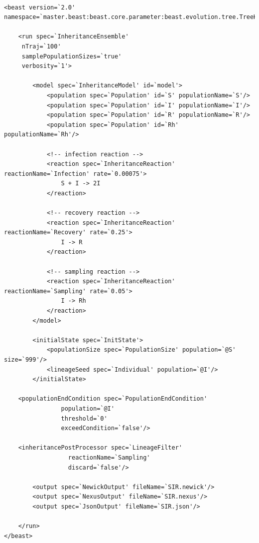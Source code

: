 \documentclass[10pt]{article}
\begin{document}
\footnotesize{
\begin{lstlisting}

<beast version=`2.0' 
namespace=`master.beast:beast.core.parameter:beast.evolution.tree.TreeHeightLogger'>

    <run spec=`InheritanceEnsemble'
	 nTraj=`100'
	 samplePopulationSizes=`true'
	 verbosity=`1'>

        <model spec=`InheritanceModel' id=`model'>
            <population spec=`Population' id=`S' populationName=`S'/>
            <population spec=`Population' id=`I' populationName=`I'/>
            <population spec=`Population' id=`R' populationName=`R'/>
            <population spec=`Population' id=`Rh' populationName=`Rh'/>
            
            <!-- infection reaction -->
            <reaction spec=`InheritanceReaction' reactionName=`Infection' rate=`0.00075'>
                S + I -> 2I
            </reaction>
            
            <!-- recovery reaction -->
            <reaction spec=`InheritanceReaction' reactionName=`Recovery' rate=`0.25'>
                I -> R
            </reaction>
            
            <!-- sampling reaction -->
            <reaction spec=`InheritanceReaction' reactionName=`Sampling' rate=`0.05'>
                I -> Rh
            </reaction>
        </model>

        <initialState spec=`InitState'>
            <populationSize spec=`PopulationSize' population=`@S' size=`999'/>
            <lineageSeed spec=`Individual' population=`@I'/>
        </initialState>

	<populationEndCondition spec=`PopulationEndCondition'
				population=`@I'
				threshold=`0'
				exceedCondition=`false'/>

	<inheritancePostProcessor spec=`LineageFilter'
				  reactionName=`Sampling'
				  discard=`false'/>
		
        <output spec=`NewickOutput' fileName=`SIR.newick'/>
        <output spec=`NexusOutput' fileName=`SIR.nexus'/>
        <output spec=`JsonOutput' fileName=`SIR.json'/>

    </run>
</beast>
\end{lstlisting}}
\end{document}
